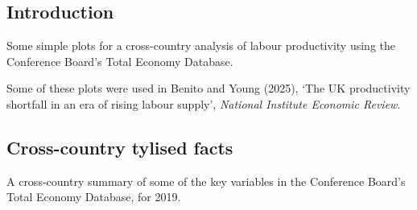 \documentclass[
  12pt,
  letterpaper,
]{article}
\renewcommand*\contentsname{Table of contents}
\newcommand\contentsname{Table of contents}
\begin{document}


\pagestyle{fancy}
\cfoot{\thepage}
\renewcommand*\contentsname{Table of contents}
{
\hypersetup{linkcolor=}
\setcounter{tocdepth}{3}
\tableofcontents
}
\subsection{Introduction}\label{introduction}

Some simple plots for a cross-country analysis of labour productivity
using the Conference Board's Total Economy Database.

Some of these plots were used in Benito and Young (2025), `The UK
productivity shortfall in an era of rising labour supply',
\emph{National Institute Economic Review}.

\subsection{Cross-country tylised
facts}\label{cross-country-tylised-facts}

A cross-country summary of some of the key variables in the Conference
Board's Total Economy Database, for 2019.
\end{document}
